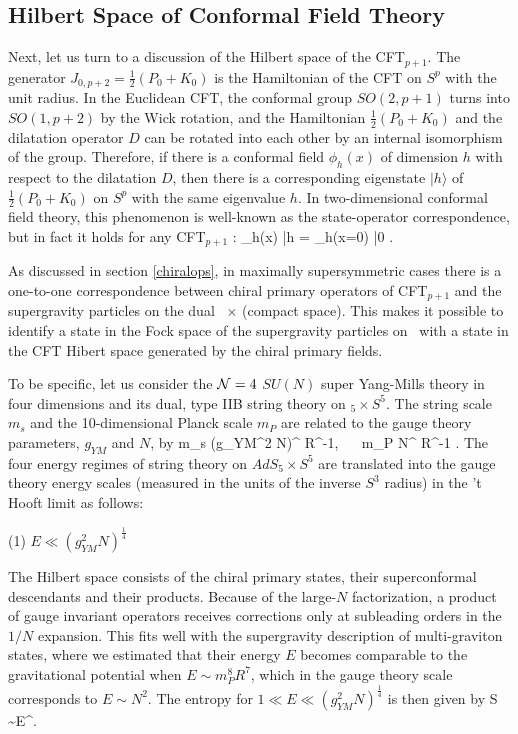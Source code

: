 \subsection{Hilbert Space of Conformal Field Theory}

Next, let us turn to a discussion of the Hilbert space of
the CFT$_{p+1}$. The generator $J_{0,p+2}=
\frac{1}{2}(P_0+K_0)$ is the Hamiltonian of the CFT on $S^p$
with the unit radius. In the Euclidean CFT, the conformal
group $SO(2,p+1)$ turns into $SO(1,p+2)$ by the Wick rotation, 
and the Hamiltonian $\frac{1}{2}(P_0+K_0)$ and the dilatation 
operator $D$ can be rotated into each other by an internal 
isomorphism of the group. Therefore, if there is a conformal 
field $\phi_h(x)$ of dimension $h$ with respect to the dilatation 
$D$, then there is a corresponding eigenstate $|h \rangle$ of 
$\frac{1}{2}(P_0 + K_0)$
on $S^p$ with the same eigenvalue $h$. In two-dimensional
conformal field theory, this phenomenon is well-known as
the state-operator correspondence, but in fact it holds
for any CFT$_{p+1}$ :
\beq
  \phi_h(x) \rightarrow |h \rangle = \phi_h(x=0) |0 \rangle. 
\eeq

As discussed in section \ref{chiralops}, in maximally 
supersymmetric cases there is a one-to-one 
correspondence between chiral primary operators of CFT$_{p+1}$ and
the supergravity particles on the dual \adsp\ $\times$ (compact
space). This makes it possible to identify a state in the Fock space
of the supergravity particles on \ads\ with a state in the
CFT Hibert space generated by the chiral primary fields. 

To be specific, let us consider the ${\cal N}=4$ $SU(N)$ super Yang-Mills
theory in four dimensions and its dual, type IIB 
string theory on \ads$_5 \times S^5$. 
The string scale $m_s$ and the 10-dimensional
Planck scale $m_P$ are related to the
gauge theory parameters, $g_{YM}$ and $N$, by
\beq
   m_s \simeq (g_{YM}^2 N)^{} R^{-1}, ~~ 
m_P  \simeq N^{} R^{-1} .
\eeq
The four energy regimes of string theory on $AdS_5\times S^5$
 are translated into the gauge theory energy scales 
(measured in the units of the inverse $S^3$ radius) in the 't Hooft limit as
follows:

\medskip
\noindent
(1) $E \ll (g_{YM}^2N)^{\frac{1}{4}}$

The Hilbert space consists of the chiral primary
states, their superconformal descendants and their
products.  Because of the large-$N$ factorization, 
a product of gauge invariant operators 
receives corrections only at subleading orders in the $1/N$
expansion. 
This fits well with the supergravity
description of multi-graviton states, where we
estimated that their energy $E$
becomes comparable to the gravitational potential
when $E \sim m_P^8 R^7$, which in the gauge theory
scale corresponds to $E \sim N^2$. 
The entropy for $1 \ll E \ll (g_{YM}^2 N)^{\frac{1}{4}}$
is then given by
\beq
  S \sim E^{}.
\eeq

